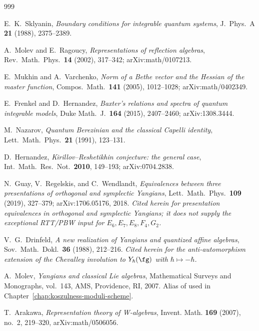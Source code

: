 \begin{thebibliography}{999}

E.~K.~Sklyanin, \emph{Boundary conditions for integrable quantum systems}, J.~Phys.~A \textbf{21} (1988), 2375--2389.

A.~Molev and E.~Ragoucy, \emph{Representations of reflection algebras}, Rev.~Math.~Phys.~\textbf{14} (2002), 317--342; arXiv:math/0107213.

E.~Mukhin and A.~Varchenko, \emph{Norm of a Bethe vector and the Hessian of the master function}, Compos.~Math.~\textbf{141} (2005), 1012--1028; arXiv:math/0402349.

E.~Frenkel and D.~Hernandez, \emph{Baxter's relations and spectra of quantum integrable models}, Duke Math.~J.~\textbf{164} (2015), 2407--2460; arXiv:1308.3444.

M.~Nazarov, \emph{Quantum Berezinian and the classical Capelli identity}, Lett.~Math.~Phys.~\textbf{21} (1991), 123--131.

D.~Hernandez, \emph{Kirillov--Reshetikhin conjecture: the general case}, Int.~Math.~Res.~Not.~\textbf{2010}, 149--193; arXiv:0704.2838.


N.~Guay, V.~Regelskis, and C.~Wendlandt, \emph{Equivalences between three presentations of orthogonal and symplectic Yangians}, Lett.~Math.~Phys.~\textbf{109} (2019), 327--379; arXiv:1706.05176, 2018.  \emph{Cited herein for presentation equivalences in orthogonal and symplectic Yangians; it does not supply the exceptional RTT/PBW input for $E_6, E_7, E_8, F_4, G_2$.}

V.~G.~Drinfeld, \emph{A new realization of Yangians and quantized affine algebras}, Sov.~Math.~Dokl.~\textbf{36} (1988), 212--216.  \emph{Cited herein for the anti-automorphism extension of the Chevalley involution to $Y_\hbar(\fg)$ with $\hbar \mapsto -\hbar$.}

A.~Molev, \emph{Yangians and classical Lie algebras}, Mathematical Surveys and Monographs, vol.~143, AMS, Providence, RI, 2007.  Alias of \cite{Molev07} used in Chapter~\ref{chap:koszulness-moduli-scheme}.


T.~Arakawa, \emph{Representation theory of W-algebras}, Invent. Math. \textbf{169} (2007), no.~2, 219--320, arXiv:math/0506056.


\end{thebibliography}
